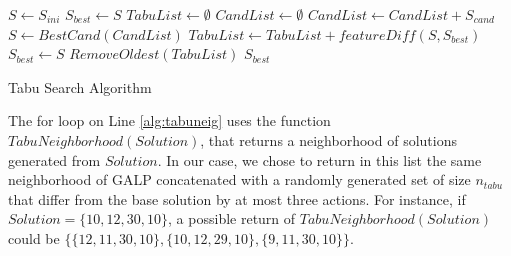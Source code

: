 \begin{algorithm}[H]
\begin{algorithmic}[1]
\State $S \gets S_{ini}$
\State $S_{best} \gets S$
\State $TabuList \gets \emptyset$
    \State $CandList \gets \emptyset$
            \State $CandList \gets CandList + S_{cand}$
        \EndIf
    \EndFor
    \State $S \gets BestCand(CandList)$
        \State $TabuList \gets TabuList + featureDiff(S, S_{best})$
        \State $S_{best} \gets S$
            \State $RemoveOldest(TabuList)$
        \EndWhile
    \EndIf
\EndWhile
\State \Return $S_{best}$
\EndFunction
\end{algorithmic}
\caption{Tabu Search Algorithm}
\label{alg:ts}
\end{algorithm}

The for loop on Line \ref{alg:tabuneig} uses the function $TabuNeighborhood(Solution)$,
that returns a neighborhood of  solutions generated from $Solution$.
In our case, we chose to return in this list the same neighborhood of GALP
concatenated with a randomly generated set of size $n_{tabu}$ that differ from the base solution
by at most three actions. For instance, if $Solution = \{10, 12, 30, 10\}$, a possible return of
$TabuNeighborhood(Solution)$ could be $\{\{12, 11, 30, 10\},\{10,12,29,10\},\{9,11,30,10\}\}$.



